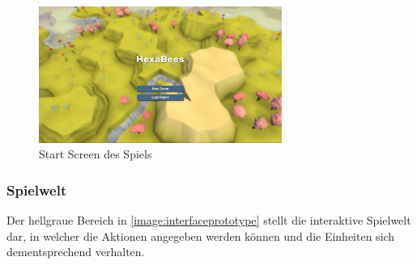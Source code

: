 \begin{figure}
    \begin{center}
        \includegraphics[width=300px]{0.bilder/startscreen.png}
    \end{center}
    \caption{Start Screen des Spiels} \label{image:startscreen}
\end{figure}

\subsubsection{Spielwelt}
Der hellgraue Bereich in \autoref{image:interfaceprototype} stellt die interaktive Spielwelt dar, in welcher die Aktionen angegeben werden können und die Einheiten sich dementsprechend verhalten.